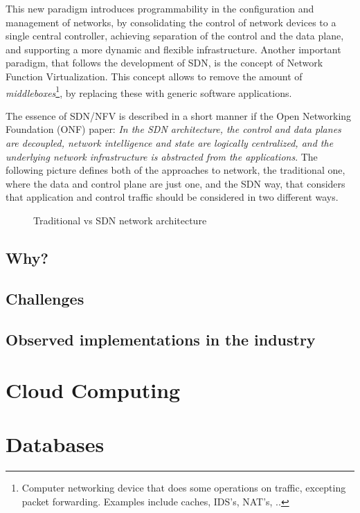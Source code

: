\p This new paradigm introduces programmability in the configuration and management of networks, by consolidating the control of network devices to a single central controller, achieving separation of the control and the 
data plane, and supporting a more dynamic and flexible infrastructure. Another important paradigm, that follows the development of SDN, is the concept of Network Function Virtualization. This concept allows to remove the amount of 
        \textit {middleboxes}\footnote {Computer networking device that does some operations on traffic, excepting packet forwarding. Examples include caches, IDS's, NAT's, ..}, by replacing these with generic software 
applications.

\p The essence of SDN/NFV is described in a short manner if the Open Networking Foundation (ONF) paper: \textit{ In the SDN architecture, the control and data planes are decoupled,  network intelligence and state are 
logically centralized, and the underlying network infrastructure is abstracted from the applications}. The following picture defines both of the approaches to network, the traditional one, where the data and control plane
are just one, and the SDN way, that considers that application and control traffic should be considered in two different ways. 

\begin{figure}[!tbph]
  \centering
  \hfill
  \caption {Traditional vs SDN network architecture}
\end{figure}

\subsection {Why?}
\subsection {Challenges}
\subsection {Observed implementations in the industry}

\section {Cloud Computing}
\section {Databases} 


